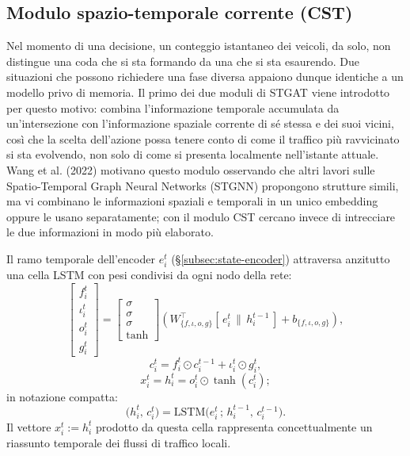 \subsection{Modulo spazio-temporale corrente (CST)}
\label{subsec:cst-module}

Nel momento di una decisione, un conteggio istantaneo dei veicoli, da solo, non distingue una coda che si
sta formando da una che si sta esaurendo. Due situazioni che possono
richiedere una fase diversa appaiono dunque identiche a un modello privo
di memoria. Il primo dei due moduli di STGAT viene introdotto per questo motivo:
combina l'informazione temporale accumulata da un'intersezione con
l'informazione spaziale corrente di sé stessa e dei suoi vicini, così che la scelta dell'azione
possa tenere conto di come il traffico più ravvicinato si sta
evolvendo, non solo di come si presenta localmente nell'istante attuale.
Wang et al. (2022) motivano questo modulo osservando che altri lavori
sulle Spatio-Temporal Graph Neural Networks (STGNN) propongono strutture
simili, ma vi combinano le informazioni spaziali e temporali in un unico
embedding oppure le usano separatamente; con il modulo CST cercano invece
di intrecciare le due informazioni in modo più elaborato.

Il ramo temporale dell'encoder $e_i^t$ (§\ref{subsec:state-encoder})
attraversa anzitutto una cella LSTM con pesi condivisi da ogni nodo della rete:
\begin{equation}
  \begin{bmatrix} f_i^t \\ \iota_i^t \\ o_i^t \\ g_i^t \end{bmatrix} =
  \begin{bmatrix} \sigma \\ \sigma \\ \sigma \\ \tanh \end{bmatrix}
  \left(
  W_{\{f,\iota,o,g\}}^{\top} [\,e_i^t \,\|\, h_i^{t-1}\,] + b_{\{f,\iota,o,g\}}
  \right),
  \label{eq:stgat-lstm-gates}
\end{equation}
\[ c_i^t = f_i^t \odot c_i^{t-1} + \iota_i^t \odot g_i^t, \]
\[ x_i^t = h_i^t = o_i^t \odot \tanh(c_i^t); \]
in notazione compatta:
\begin{equation}
  \big(h_i^t,\, c_i^t\big) = \mathrm{LSTM}\big(e_i^t \,;\, h_i^{t-1},\, c_i^{t-1}\big).
  \label{eq:stgat-lstm-compact}
\end{equation}
Il vettore $x_i^t := h_i^t$ prodotto da questa cella rappresenta concettualmente un riassunto temporale dei flussi di traffico locali.

